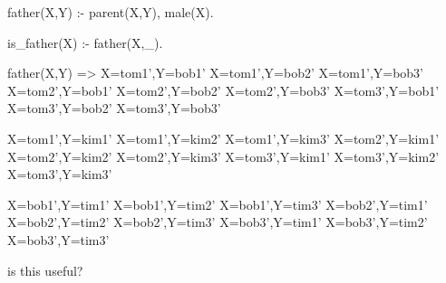 father(X,Y) :- parent(X,Y), male(X).

is_father(X) :- father(X,_).

father(X,Y) =>
    X=tom1',Y=bob1'
    X=tom1',Y=bob2'
    X=tom1',Y=bob3'
    X=tom2',Y=bob1'
    X=tom2',Y=bob2'
    X=tom2',Y=bob3'
    X=tom3',Y=bob1'
    X=tom3',Y=bob2'
    X=tom3',Y=bob3'

    X=tom1',Y=kim1'
    X=tom1',Y=kim2'
    X=tom1',Y=kim3'
    X=tom2',Y=kim1'
    X=tom2',Y=kim2'
    X=tom2',Y=kim3'
    X=tom3',Y=kim1'
    X=tom3',Y=kim2'
    X=tom3',Y=kim3'

    X=bob1',Y=tim1'
    X=bob1',Y=tim2'
    X=bob1',Y=tim3'
    X=bob2',Y=tim1'
    X=bob2',Y=tim2'
    X=bob2',Y=tim3'
    X=bob3',Y=tim1'
    X=bob3',Y=tim2'
    X=bob3',Y=tim3'

is this useful?